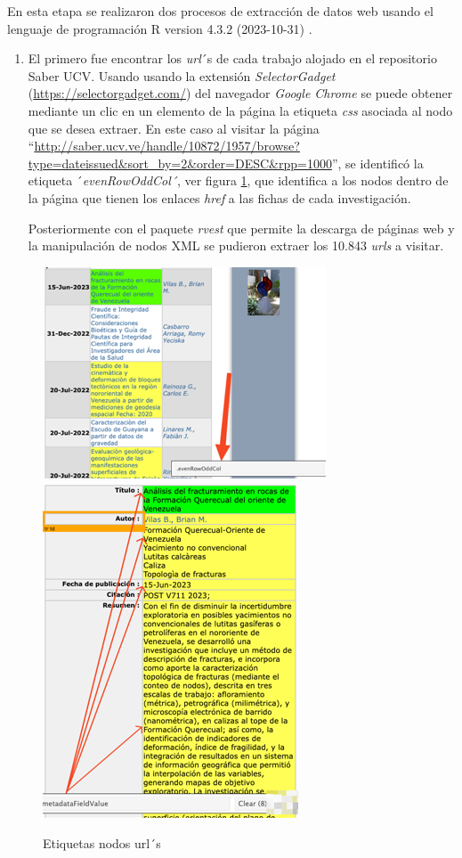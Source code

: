 \documentclass[
  12pt,
  openany]{book}
\begin{document}
En esta etapa se realizaron dos procesos de extracción de datos web usando el lenguaje de programación R version 4.3.2 (2023-10-31) \citep{R}.

\begin{enumerate}
\def\labelenumi{\arabic{enumi}.}
\item
  El primero fue encontrar los \emph{url}´s de cada trabajo alojado en el repositorio Saber UCV. Usando usando la extensión \emph{SelectorGadget} (\url{https://selectorgadget.com/}) del navegador \emph{Google Chrome} se puede obtener mediante un clic en un elemento de la página la etiqueta \emph{css} asociada al nodo que se desea extraer. En este caso al visitar la página ``\protect\hyperlink{0}{http://saber.ucv.ve/handle/10872/1957/browse?type=dateissued\&sort\_by=2\&order=DESC\&rpp=1000}'', se identificó la etiqueta ´\emph{evenRowOddCol´}, ver figura \ref{fig:nodosurl}, que identifica a los nodos dentro de la página que tienen los enlaces \emph{href} a las fichas de cada investigación.

  Posteriormente con el paquete \emph{rvest} \citep{rvest} que permite la descarga de páginas web y la manipulación de nodos XML se pudieron extraer los 10.843 \emph{urls} a visitar.
\end{enumerate}

\begin{figure}

{\centering \includegraphics[width=0.5\linewidth]{images/05-desarrollo/1_ciclo/Picture3} \includegraphics[width=0.5\linewidth]{images/05-desarrollo/1_ciclo/Picture2} 

}

\caption{Etiquetas nodos url´s}\label{fig:nodosurl}
\end{figure}
\end{document}
